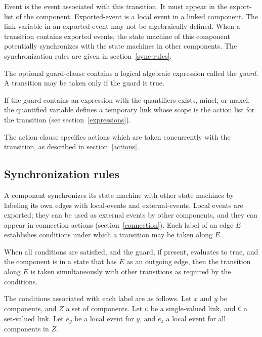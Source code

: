 {\nont Event} is the event associated with this transition.  It must
appear in the {\nont export-list} of the component.  {\nont
Exported-event} is a local event in a linked component.  The link
variable in an exported event may not be algebraically defined.  When
a transition contains exported events, the state machine of this
component potentially synchronizes with the state machines in other
components.  The synchronization rules are given in
section~\ref{sync-rules}.

The optional {\nont guard-clause} contains a logical algebraic
expression called the {\em guard}.  A transition
may be taken only if the guard is true.

If the guard contains an expression with the quantifiers {\tok
exists}, {\tok minel}, or {\tok maxel}, the quantified variable
defines a temporary link whose scope is the action list for the
transition (see section~\ref{expressions}).

The {\nont action-clause} specifies actions which are taken
concurrently with the transition, as described in section~\ref{actions}.

\subsection{Synchronization rules\label{sync-rules}}

A component synchronizes its state machine with other state machines
by labeling its own edges with {\nont local-event}s and {\nont
external-event}s.  Local events are exported; they can be used as
external events by other components, and they can appear in {\nont
connection actions} (section~\ref{connection}).  Each label of an edge
$E$ establishes conditions under which a transition may be taken along
$E$.

When all conditions are satisfied, and the guard, if present,
evaluates to true, and the component is in a state that has $E$ as an
outgoing edge, then the transition along $E$ is taken simultaneously
with other transitions as required by the conditions.

The conditions associated with each label are as follows.  Let $x$ and
$y$ be components, and $Z$ a set of components.  Let {\tt c} be a
single-valued link, and {\tt C} a set-valued link.  Let $e_y$ be a
local event for $y$, and $e_z$ a local event for all components in
$Z$.

